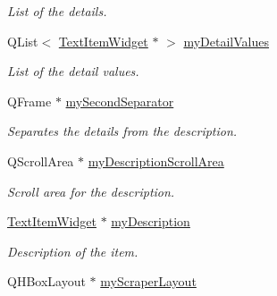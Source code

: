 \begin{DoxyCompactItemize}
\begin{DoxyCompactList}\small\item\em List of the details. \end{DoxyCompactList}\item 
\hypertarget{class_u_i_1_1_info_pane_afd1ff584546c56a079391ba65457f078}{Q\-List$<$ \hyperlink{class_u_i_1_1_text_item_widget}{Text\-Item\-Widget} $\ast$ $>$ \hyperlink{class_u_i_1_1_info_pane_afd1ff584546c56a079391ba65457f078}{my\-Detail\-Values}}\label{class_u_i_1_1_info_pane_afd1ff584546c56a079391ba65457f078}

\begin{DoxyCompactList}\small\item\em List of the detail values. \end{DoxyCompactList}\item 
\hypertarget{class_u_i_1_1_info_pane_ab0e91705d5aea39a5b559f31c6670245}{Q\-Frame $\ast$ \hyperlink{class_u_i_1_1_info_pane_ab0e91705d5aea39a5b559f31c6670245}{my\-Second\-Separator}}\label{class_u_i_1_1_info_pane_ab0e91705d5aea39a5b559f31c6670245}

\begin{DoxyCompactList}\small\item\em Separates the details from the description. \end{DoxyCompactList}\item 
\hypertarget{class_u_i_1_1_info_pane_acde5598a4ec2da8193e4937dda19a69d}{Q\-Scroll\-Area $\ast$ \hyperlink{class_u_i_1_1_info_pane_acde5598a4ec2da8193e4937dda19a69d}{my\-Description\-Scroll\-Area}}\label{class_u_i_1_1_info_pane_acde5598a4ec2da8193e4937dda19a69d}

\begin{DoxyCompactList}\small\item\em Scroll area for the description. \end{DoxyCompactList}\item 
\hypertarget{class_u_i_1_1_info_pane_a4daad13e42b86a4bc909276fe3d50253}{\hyperlink{class_u_i_1_1_text_item_widget}{Text\-Item\-Widget} $\ast$ \hyperlink{class_u_i_1_1_info_pane_a4daad13e42b86a4bc909276fe3d50253}{my\-Description}}\label{class_u_i_1_1_info_pane_a4daad13e42b86a4bc909276fe3d50253}

\begin{DoxyCompactList}\small\item\em Description of the item. \end{DoxyCompactList}\item 
\hypertarget{class_u_i_1_1_info_pane_a6652a28b3ead176fdec1fa052911dbe1}{Q\-H\-Box\-Layout $\ast$ \hyperlink{class_u_i_1_1_info_pane_a6652a28b3ead176fdec1fa052911dbe1}{my\-Scraper\-Layout}}\label{class_u_i_1_1_info_pane_a6652a28b3ead176fdec1fa052911dbe1}


\end{DoxyCompactItemize}
